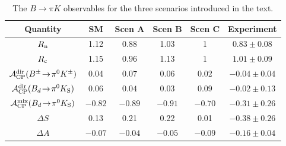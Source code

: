 \documentclass[12pt]{article}
\begin{document}
\begin{table}%
\vspace{0.4cm}
\begin{center}
\begin{tabular}{|c||c|c|c|c|c|}
\hline
  Quantity & SM & Scen A & Scen B &  Scen C & Experiment
 \\ \hline 
$R_{\rm n}$  & 1.12 &$0.88$ & 1.03 &  1 & $0.83 \pm 0.08$ \\\hline
$R_{\rm c}$  & 1.15 &$0.96$ & 1.13 & 1  & $1.01 \pm 0.09$ \\\hline
${\cal A}_{\rm CP}^{\rm dir}(B^\pm\!\to\!\pi^0 K^\pm) $ &
  0.04 & $0.07$  \rule{0em}{1.05em}& 0.06 & 0.02  &  $-0.04 \pm 0.04$ \\ \hline
${\cal A}_{\rm CP}^{\rm dir}(B_d\!\to\!\pi^0 K_{\rm S})$ & 
  0.06 & $0.04$  \rule{0em}{1.05em}& 0.03  & 0.09 & $-0.02 \pm 0.13$ \\ \hline 
${\cal A}_{\rm CP}^{\rm mix}(B_d\!\to\!\pi^0 K_{\rm S})$ & 
  $-0.82$ & $-0.89$\rule{0em}{1.05em}& $-0.91$ & $-0.70$ &  $-0.31 \pm 0.26$ \\ \hline
$\Delta S$ & 0.13& 0.21& 0.22& 0.01& $-0.38\pm0.26$ \\ \hline
$\Delta A$ & $-0.07$& $-0.04$& $-0.05$& $-0.09$& $-0.16\pm0.04$ \\ \hline
\end{tabular}
\caption{\label{Scentab1} The $B\to\pi K$ observables for the 
 three scenarios introduced in the text. }
\end{center}
\end{table}
\end{document}
